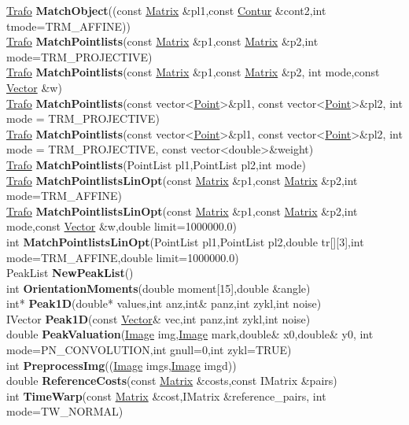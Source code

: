 \documentclass[10pt,titlepage]{article}
\def\functionlistentry#1#2#3#4#5#6{\noindent #1 {\bf #2}(#3) \dotfill #6\\}
\begin{document}
{{\functionlistentry{\hyperlink{Trafo}{Trafo}}{MatchObject}{(const \hyperlink{Matrix}{Matrix} \&pl1,const \hyperlink{Contur}{Contur} \&cont2,int tmode=TRM\_AFFINE)}{1273}{registration}{}
\functionlistentry{\hyperlink{Trafo}{Trafo}}{MatchPointlists}{const \hyperlink{Matrix}{Matrix} \&p1,const \hyperlink{Matrix}{Matrix} \&p2,int mode=TRM\_PROJECTIVE}{1244}{registration}{}
\functionlistentry{\hyperlink{Trafo}{Trafo}}{MatchPointlists}{const \hyperlink{Matrix}{Matrix} \&p1,const \hyperlink{Matrix}{Matrix} \&p2, int mode,const \hyperlink{Vector}{Vector} \&w}{1245}{registration}{}
\functionlistentry{\hyperlink{Trafo}{Trafo}}{MatchPointlists}{const vector\textless {}\hyperlink{Point}{Point}\textgreater  \&pl1, const vector\textless {}\hyperlink{Point}{Point}\textgreater  \&pl2, int mode = TRM\_PROJECTIVE}{1246}{registration}{}
\functionlistentry{\hyperlink{Trafo}{Trafo}}{MatchPointlists}{const vector\textless {}\hyperlink{Point}{Point}\textgreater  \&pl1, const vector\textless {}\hyperlink{Point}{Point}\textgreater  \&pl2, int mode = TRM\_PROJECTIVE, const vector\textless {}double\textgreater  \&weight}{1247}{registration}{}
\functionlistentry{\hyperlink{Trafo}{Trafo}}{MatchPointlists}{PointList pl1,PointList pl2,int mode}{1248}{registration}{}
\functionlistentry{\hyperlink{Trafo}{Trafo}}{MatchPointlistsLinOpt}{const \hyperlink{Matrix}{Matrix} \&p1,const \hyperlink{Matrix}{Matrix} \&p2,int mode=TRM\_AFFINE}{1249}{registration}{}
\functionlistentry{\hyperlink{Trafo}{Trafo}}{MatchPointlistsLinOpt}{const \hyperlink{Matrix}{Matrix} \&p1,const \hyperlink{Matrix}{Matrix} \&p2,int mode,const \hyperlink{Vector}{Vector} \&w,double limit=1000000.0}{1250}{registration}{}
\functionlistentry{int}{MatchPointlistsLinOpt}{PointList pl1,PointList pl2,double tr[][3],int mode=TRM\_AFFINE,double limit=1000000.0}{1251}{registration}{}
\functionlistentry{PeakList}{NewPeakList}{}{1259}{registration}{}
\functionlistentry{int}{OrientationMoments}{double moment[15],double \&angle}{1274}{registration}{}
\functionlistentry{int*}{Peak1D}{double* values,int anz,int\& panz,int zykl,int noise}{1256}{registration}{}
\functionlistentry{IVector}{Peak1D}{const \hyperlink{Vector}{Vector}\& vec,int panz,int zykl,int noise}{1257}{registration}{}
\functionlistentry{double}{PeakValuation}{\hyperlink{Image}{Image} img,\hyperlink{Image}{Image} mark,double\& x0,double\& y0, int mode=PN\_CONVOLUTION,int gnull=0,int zykl=TRUE}{1255}{registration}{}
\functionlistentry{int}{PreprocessImg}{(\hyperlink{Image}{Image} imgs,\hyperlink{Image}{Image} imgd)}{1254}{registration}{}
\functionlistentry{double}{ReferenceCosts}{const \hyperlink{Matrix}{Matrix} \&costs,const IMatrix \&pairs}{1262}{registration}{}
\functionlistentry{int}{TimeWarp}{const \hyperlink{Matrix}{Matrix} \&cost,IMatrix \&reference\_pairs, int mode=TW\_NORMAL}{1265}{registration}{}

}}
\end{document}
